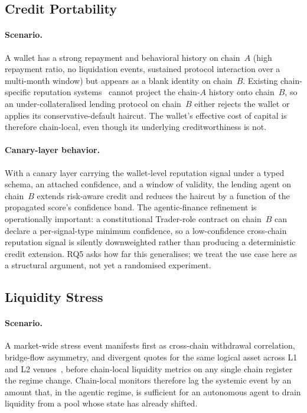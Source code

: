 \documentclass[journal]{IEEEtran}
\begin{document}
\subsection{Credit Portability}\label{sec:uc:credit}

\paragraph*{Scenario.}
A wallet has a strong repayment and behavioral history on chain~$A$
(high repayment ratio, no liquidation events, sustained protocol
interaction over a multi-month window) but appears as a blank identity
on chain~$B$. Existing chain-specific reputation
systems~\cite{HasanBB23,AlmasoudHH20} cannot project the chain-$A$
history onto chain~$B$, so an under-collateralised lending protocol on
chain~$B$ either rejects the wallet or applies its conservative-default
haircut. The wallet's effective cost of capital is therefore
chain-local, even though its underlying creditworthiness is not.

\paragraph*{Canary-layer behavior.}
With a canary layer carrying the wallet-level reputation signal under
a typed schema, an attached confidence, and a window of validity, the
lending agent on chain~$B$ extends risk-aware credit and reduces the
haircut by a function of the propagated score's confidence band. The
agentic-finance refinement is operationally important: a constitutional
Trader-role contract on chain~$B$ can declare a per-signal-type minimum
confidence, so a low-confidence cross-chain reputation signal is
silently downweighted rather than producing a deterministic credit
extension. RQ5 asks how far this generalises; we treat the use case
here as a structural argument, not yet a randomised experiment.

\subsection{Liquidity Stress}\label{sec:uc:liquidity}

\paragraph*{Scenario.}
A market-wide stress event manifests first as cross-chain withdrawal
correlation, bridge-flow asymmetry, and divergent quotes for the same
logical asset across L1 and L2 venues~\cite{gogol2024liquidity}, before
chain-local liquidity metrics on any single chain register the regime
change. Chain-local monitors therefore lag the systemic event by an
amount that, in the agentic regime, is sufficient for an autonomous
agent to drain liquidity from a pool whose state has already shifted.
\end{document}
